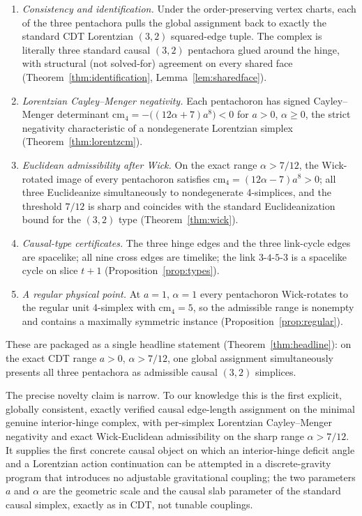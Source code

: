 \documentclass[11pt]{article}
\theoremstyle{definition}
\theoremstyle{remark}
\newcommand{\cm}{\mathrm{cm}_{4}}
\begin{document}
\begin{enumerate}
\item \emph{Consistency and identification.} Under the order-preserving vertex charts, each of the three pentachora pulls the global assignment back to exactly the standard CDT Lorentzian $(3,2)$ squared-edge tuple. The complex is literally three standard causal $(3,2)$ pentachora glued around the hinge, with structural (not solved-for) agreement on every shared face (Theorem~\ref{thm:identification}, Lemma~\ref{lem:sharedface}).
\item \emph{Lorentzian Cayley--Menger negativity.} Each pentachoron has signed Cayley--Menger determinant $\cm=-\bigl((12\alpha+7)a^{8}\bigr)<0$ for $a>0$, $\alpha\ge 0$, the strict negativity characteristic of a nondegenerate Lorentzian simplex (Theorem~\ref{thm:lorentzcm}).
\item \emph{Euclidean admissibility after Wick.} On the exact range $\alpha>7/12$, the Wick-rotated image of every pentachoron satisfies $\cm=(12\alpha-7)a^{8}>0$; all three Euclideanize simultaneously to nondegenerate 4-simplices, and the threshold $7/12$ is sharp and coincides with the standard Euclideanization bound for the $(3,2)$ type \cite{AJL} (Theorem~\ref{thm:wick}).
\item \emph{Causal-type certificates.} The three hinge edges and the three link-cycle edges are spacelike; all nine cross edges are timelike; the link $3$-$4$-$5$-$3$ is a spacelike cycle on slice $t+1$ (Proposition~\ref{prop:types}).
\item \emph{A regular physical point.} At $a=1$, $\alpha=1$ every pentachoron Wick-rotates to the regular unit 4-simplex with $\cm=5$, so the admissible range is nonempty and contains a maximally symmetric instance (Proposition~\ref{prop:regular}).
\end{enumerate}

These are packaged as a single headline statement (Theorem~\ref{thm:headline}): on the exact CDT range $a>0$, $\alpha>7/12$, one global assignment simultaneously presents all three pentachora as admissible causal $(3,2)$ simplices.

The precise novelty claim is narrow. To our knowledge this is the first explicit, globally consistent, exactly verified causal edge-length assignment on the minimal genuine interior-hinge complex, with per-simplex Lorentzian Cayley--Menger negativity and exact Wick-Euclidean admissibility on the sharp range $\alpha>7/12$. It supplies the first concrete causal object on which an interior-hinge deficit angle and a Lorentzian action continuation can be attempted in a discrete-gravity program that introduces no adjustable gravitational coupling; the two parameters $a$ and $\alpha$ are the geometric scale and the causal slab parameter of the standard causal simplex, exactly as in CDT, not tunable couplings.
\end{document}
